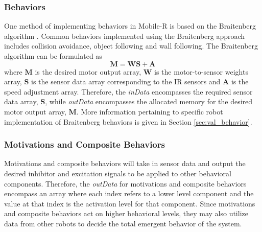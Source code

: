       \subsubsection{Behaviors} \label{sec:imp_behaviors}
        One method of implementing behaviors in Mobile-R is based on the
          Braitenberg algorithm \cite{Braitenberg}. 
        Common behaviors implemented using the Braitenberg approach includes 
          collision avoidance, object following and wall following.
        The Braitenberg algorithm can be formulated as
        \begin{equation}
          \mathbf{M} = \mathbf{W}\mathbf{S}+\mathbf{A}
          \label{eqn:behavior}
        \end{equation}
          where $\mathbf{M}$ is the desired motor output array, $\mathbf{W}$ is 
          the motor-to-sensor weights array, $\mathbf{S}$ is the sensor data 
          array corresponding to the IR sensors and $\mathbf{A}$ is the speed 
          adjustment array.
        Therefore, the \textit{inData} encompasses the required sensor data
          array, $\mathbf{S}$, while \textit{outData} encompasses the
          allocated memory for the desired motor output array, $\mathbf{M}$.
        More information pertaining to specific robot implementation of 
          Braitenberg behaviors is given in Section \ref{sec:val_behavior}.

      \subsubsection{Motivations and Composite Behaviors}
        Motivations and composite behaviors will take in sensor data and output 
          the desired inhibitor and excitation signals to be applied to other 
          behavioral components.
        Therefore, the \textit{outData} for motivations and composite behaviors
          encompass an array where each index refers to a lower level
          component and the value at that index is the activation level for
          that component.
        Since motivations and composite behaviors act on higher behavioral
          levels, they may also utilize data from other robots to decide the 
          total emergent behavior of the system.

